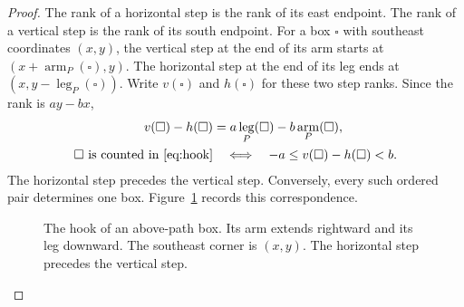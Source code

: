 \documentclass[12pt,reqno]{amsart}
\numberwithin{equation}{section}
\theoremstyle{definition}
\theoremstyle{remark}
\theoremstyle{plain}
\DeclareMathOperator{\arm}{arm}
\DeclareMathOperator{\leg}{leg}
\begin{document}
\begin{proof}
The rank of a horizontal step is the rank of its east endpoint.
The rank of a vertical step is the rank of its south endpoint.
For a box $\square$ with southeast coordinates $(x,y)$, the vertical
step at the end of its arm starts at $(x+\arm_P(\square),y)$.
The horizontal step at the end of its leg ends at
$(x,y-\leg_P(\square))$.
Write $v(\square)$ and $h(\square)$ for these two step ranks.
Since the rank is $ay-bx$,
\begin{equation}\label{eq:rankhook}
 \begin{aligned}
 v(\square)-h(\square)
     &=a\leg_P(\square)-b\arm_P(\square),\\
 \square\text{ is counted in \eqref{eq:hook}}
     &\quad\Longleftrightarrow\quad -a\le v(\square)-h(\square)<b.
 \end{aligned}
\end{equation}
The horizontal step precedes the vertical step.
Conversely, every such ordered pair determines one box.
Figure~\ref{fig:hookranks} records this correspondence.

\begin{figure}[!htbp]
\centering
{}
\caption{The hook of an above-path box.  Its arm extends rightward and
its leg downward.  The southeast corner is $(x,y)$.
The horizontal step precedes the vertical step.}
\label{fig:hookranks}
\end{figure}


\end{proof}
\end{document}
